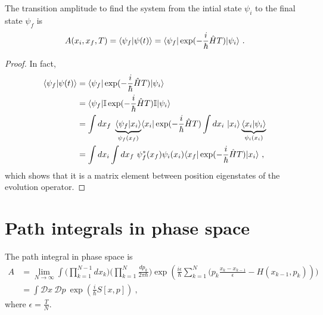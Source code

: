     The transition amplitude to find the system from the intial state $\psi_i$ to the final state $\psi_f$ is 
    \begin{equation*}
        A(x_i, x_f, T) = \langle\psi_f\vert\psi(t)\rangle = \langle\psi_f\vert \exp(- \frac{i}{\hbar} \hat H T) \vert\psi_i\rangle ~.
    \end{equation*}
    \begin{proof}
        In fact, 
        \begin{equation*}
        \begin{aligned}
            \langle\psi_f\vert\psi(t)\rangle & = \langle\psi_f\vert \exp(- \frac{i}{\hbar} \hat H T) \vert\psi_i\rangle \\ & = \langle\psi_f\vert \mathbb I \exp(- \frac{i}{\hbar} \hat H T) \mathbb I \vert\psi_i\rangle \\ & = \int dx_f ~ \underbrace{\langle\psi_f\vert x_i\rangle}_{\psi_f(x_f)} \langle x_i\vert \exp(- \frac{i}{\hbar} \hat H T) \int dx_i ~ \vert x_i\rangle \underbrace{\langle x_i\vert\psi_i\rangle}_{\psi_i(x_i)} \\ & = \int dx_i \int dx_f ~ \psi_f^* (x_f) \psi_i (x_i) \langle x_f\vert \exp(- \frac{i}{\hbar} \hat H T) \vert x_i\rangle ~,
        \end{aligned}
        \end{equation*}
        which shows that it is a matrix element between position eigenstates of the evolution operator.
    \end{proof}

\chapter{Path integrals in phase space}

    The path integral in phase space is 
    \begin{equation*}
    \begin{aligned}
        A & = \lim_{N \rightarrow \infty} \int \Big (\prod_{k=1}^{N-1} d x_k \Big ) \Big (\prod_{k=1}^{N} \frac{d p_k}{2\pi \hbar} \Big ) \exp(\frac{i \epsilon}{\hbar} \sum_{k=1}^{N} \Big (p_k \frac{x_k - x_{k-1}}{\epsilon} - H(x_{k-1}, p_k))) \\ & = \int \mathcal D x ~ \mathcal D p ~ \exp(\frac{i}{\hbar} S[x,p]) ~,
    \end{aligned}
    \end{equation*}
    where $\epsilon =\frac{T}{N} $.

